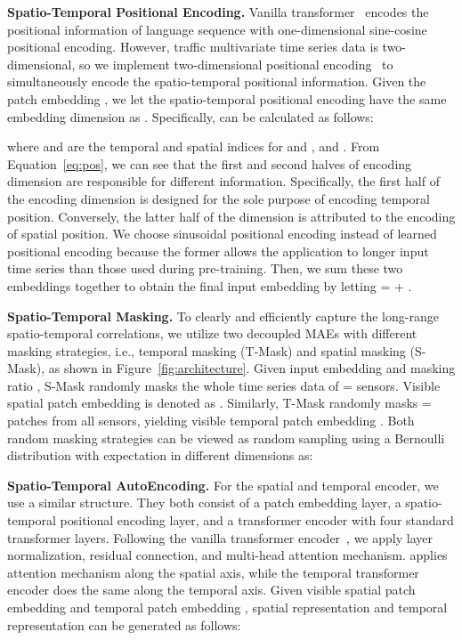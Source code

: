 \documentclass[letterpaper]{article} \usepackage{aaai24}  \usepackage{times}  \usepackage{helvet}  \usepackage{courier}  \usepackage[hyphens]{url}  \usepackage{graphicx} \urlstyle{rm} \def\UrlFont{\rm}  \usepackage{natbib}  \usepackage{caption} \frenchspacing  \setlength{\pdfpagewidth}{8.5in} \setlength{\pdfpageheight}{11in} \usepackage{algorithm}
\begin{document}
\noindent\textbf{Spatio-Temporal Positional Encoding.}
Vanilla transformer~\cite{vaswani2017attention} encodes the positional information of language sequence with one-dimensional sine-cosine positional encoding. However, traffic multivariate time series data is two-dimensional, so we implement two-dimensional positional encoding~\cite{wang2021translating} to simultaneously encode the spatio-temporal positional information. Given the patch embedding , we let the spatio-temporal positional encoding have the same embedding dimension  as . Specifically,  can be calculated as follows:

where  and  are the temporal and spatial indices for  and , and . From Equation~\ref{eq:pos}, we can see that the first and second halves of encoding dimension  are responsible for different information. Specifically, the first half of the encoding dimension  is designed for the sole purpose of encoding temporal position. Conversely, the latter half of the dimension  is attributed to the encoding of spatial position. We choose sinusoidal positional encoding instead of learned positional encoding because the former allows the application to longer input time series than those used during pre-training. Then, we sum these two embeddings together to obtain the final input embedding  by letting  =  + .







\noindent\textbf{Spatio-Temporal Masking.} To clearly and efficiently capture the long-range spatio-temporal correlations, we utilize two decoupled MAEs with different masking strategies, i.e., temporal masking (T-Mask) and spatial masking (S-Mask), as shown in Figure~\ref{fig:architecture}. Given input embedding  and masking ratio , S-Mask randomly masks the whole time series data of  =  sensors. Visible spatial patch embedding  is denoted as . Similarly, T-Mask randomly masks  =  patches from all sensors, yielding visible temporal patch embedding . Both random masking strategies can be viewed as random sampling using a Bernoulli distribution  with expectation  in different dimensions as:








\noindent\textbf{Spatio-Temporal AutoEncoding.} For the spatial and temporal encoder, we use a similar structure. They both consist of a patch embedding layer, a spatio-temporal positional encoding layer, and a transformer encoder with four standard transformer layers. Following the vanilla transformer encoder~\cite{vaswani2017attention}, we apply layer normalization, residual connection, and multi-head attention mechanism.  applies attention mechanism along the spatial axis, while the temporal transformer encoder  does the same along the temporal axis. Given visible spatial patch embedding  and temporal patch embedding , spatial representation  and temporal representation  can be generated as follows:
\end{document}
